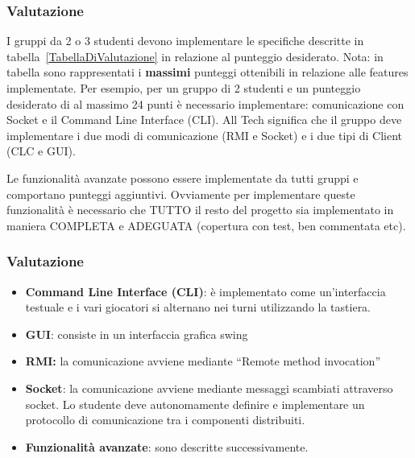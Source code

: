 \documentclass{beamer}
\begin{document}
\begin{frame}
\frametitle{Valutazione}
I gruppi da 2 o 3 studenti devono implementare  le specifiche
descritte in tabella~\ref{TabellaDiValutazione} in relazione al
punteggio desiderato. Nota: in tabella sono rappresentati i
\textbf{massimi} punteggi ottenibili in relazione alle features
implementate. Per esempio, per un gruppo di 2 studenti e un punteggio
desiderato di al massimo 24 punti \`e necessario implementare:
comunicazione con Socket e il Command Line Interface (CLI).
All Tech significa che il gruppo deve implementare i due modi di
comunicazione (RMI e Socket) e i due tipi di Client (CLC e GUI).

Le funzionalit\`a avanzate possono essere implementate da tutti gruppi e comportano punteggi aggiuntivi. Ovviamente per implementare queste funzionalit\`a \`e necessario che TUTTO il resto del progetto sia implementato in maniera COMPLETA e ADEGUATA (copertura con test, ben commentata etc).
\end{frame}



\begin{frame}
\frametitle{Valutazione}
\begin{itemize}
\item \textbf{Command Line Interface (CLI)}: \`e implementato come un'interfaccia testuale e i vari giocatori si alternano nei turni utilizzando la tastiera.
\item \textbf{GUI}: consiste in un interfaccia grafica swing
\item \textbf{RMI:} la comunicazione avviene mediante ``Remote method invocation''
\item \textbf{Socket}: la comunicazione avviene mediante messaggi scambiati
  attraverso socket. Lo studente deve autonomamente definire e
  implementare un protocollo di comunicazione tra i componenti distribuiti.
\item \textbf{Funzionalit\`a avanzate}: sono descritte successivamente.
\end{itemize}
\end{frame}
\end{document}
